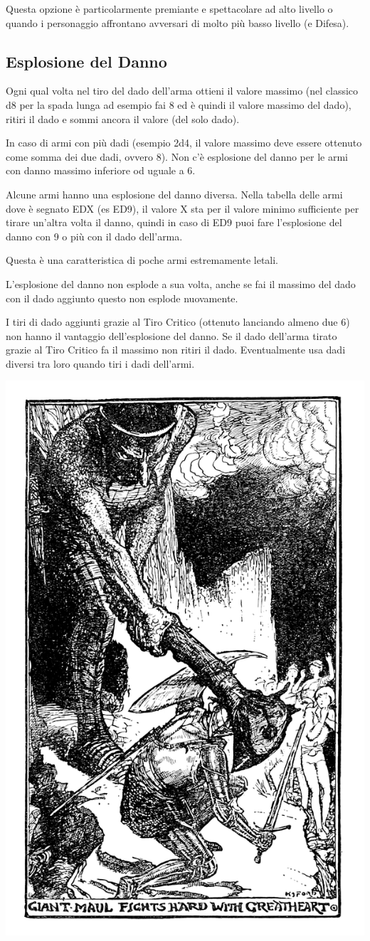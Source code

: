 \begin{multicols}{2}
Questa opzione è particolarmente premiante e spettacolare ad alto livello o quando i personaggio affrontano avversari di molto più basso livello (e Difesa).

\subsection{Esplosione del Danno}\label{esplosionedeldanno}

Ogni qual volta nel tiro del dado dell'arma ottieni il valore massimo (nel classico d8 per la spada lunga ad esempio fai 8 ed è quindi il valore massimo del dado), ritiri il dado e sommi ancora il valore (del solo dado).

In caso di armi con più dadi (esempio 2d4, il valore massimo deve essere ottenuto come somma dei due dadi, ovvero 8). Non c'è esplosione del danno per le armi con danno massimo inferiore od uguale a 6.

Alcune armi hanno una esplosione del danno diversa. Nella tabella delle armi dove è segnato EDX (es ED9), il valore X sta per il valore minimo sufficiente per tirare un'altra volta il danno, quindi in caso di ED9 puoi fare l'esplosione del danno con 9 o più con il dado dell'arma.

Questa è una caratteristica di poche armi estremamente letali.

L'esplosione del danno non esplode a sua volta, anche se fai il massimo del dado con il dado aggiunto questo non esplode nuovamente.

I tiri di dado aggiunti grazie al Tiro Critico (ottenuto lanciando almeno due 6) non hanno il vantaggio dell'esplosione del danno. Se il dado dell'arma tirato grazie al Tiro Critico fa il massimo non ritiri il dado. Eventualmente usa dadi diversi tra loro quando tiri i dadi dell'armi.

\begin{center}
\includegraphics[width=0.6\linewidth]{immagini/esplosionedanno.png}


\end{center}
\end{multicols}
